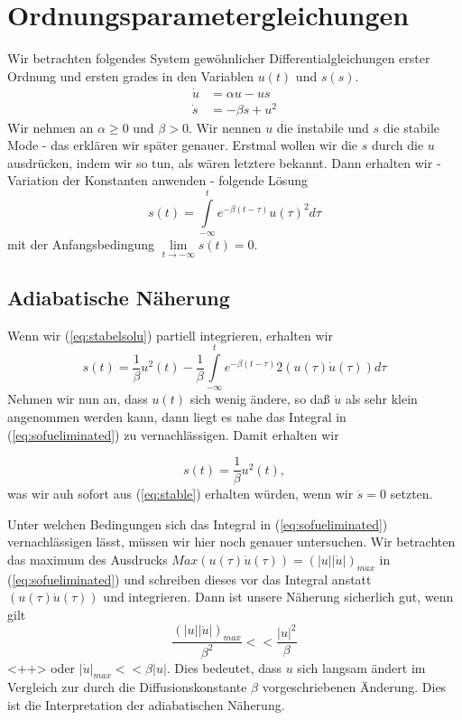 \section{Ordnungsparametergleichungen}
Wir betrachten folgendes System gewöhnlicher Differentialgleichungen erster
Ordnung und ersten grades in den Variablen $u(t)$ und $s(s)$.
\begin{align} 
  \dot{u}&=\alpha u-us
  \label{eq:unstable}\\
  \dot{s}&=-\beta s+u^2
  \label{eq:stable}
\end{align}
Wir nehmen an $\alpha\ge0$ und $\beta>0$. Wir nennen $u$ die instabile und $s$
die stabile Mode - das erklären wir später genauer. Erstmal wollen wir die $s$
durch die $u$ ausdrücken, indem wir so tun, als wären letztere bekannt. Dann
erhalten wir - Variation der Konstanten anwenden - folgende Lösung
\begin{equation}
  s(t)=\int\limits_{-\infty}^{t}e^{-\beta(t-\tau)}u(\tau)^2d\tau
  \label{eq:stabelsolu}
\end{equation}
mit der Anfangsbedingung $\lim\limits_{t\rightarrow -\infty}s(t)=0$.
\subsection{Adiabatische Näherung}
Wenn wir (\ref{eq:stabelsolu}) partiell integrieren, erhalten wir
\begin{equation}
  s(t)=\frac{1}{\beta}u^2(t)-\frac{1}{\beta}\int\limits_{-\infty}^{t}e^{-\beta(t-\tau)}
  2(u(\tau)\dot u(\tau))d\tau
  \label{eq:sofueliminated}
\end{equation}
Nehmen wir nun an, dass $u(t)$ sich wenig ändere, so daß $\dot u$ als sehr
klein angenommen werden kann, dann liegt es nahe das Integral in
(\ref{eq:sofueliminated}) zu vernachlässigen. Damit erhalten wir

\begin{equation}
  s(t)=\frac{1}{\beta}u^2(t),
  \label{eq:sapprox}
\end{equation}
was wir auh sofort aus (\ref{eq:stable}) erhalten würden, wenn wir $\dot s=0$
setzten.

Unter welchen Bedingungen sich das  Integral in (\ref{eq:sofueliminated})
vernachlässigen lässt, müssen wir hier noch genauer untersuchen. Wir betrachten
das maximum des Ausdrucks $Max(u(\tau)\dot u(\tau))=(|u||\dot u|)_{max}$ in
(\ref{eq:sofueliminated}) und schreiben dieses vor das Integral anstatt
$(u(\tau)\dot u(\tau))$ und integrieren. Dann ist unsere Näherung sicherlich
gut, wenn gilt
\begin{equation}
\frac{(|u||\dot u|)_{max}}{\beta^2}<<\frac{|u|^2}{\beta}
  \label{eq:BedElim}
\end{equation}<++>
oder $ |\dot u|_{max}<<\beta|u|$. Dies bedeutet, dass $u$ sich langsam ändert
im Vergleich zur durch die Diffusionskonstante $\beta$ vorgeschriebenen
Änderung. Dies ist die Interpretation der adiabatischen Näherung.
